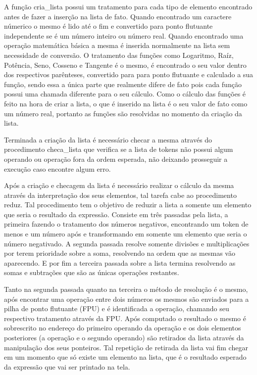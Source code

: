 \documentclass[12pt]{article}
\begin{document}
A função cria\_lista possui um tratamento para cada tipo de elemento encontrado antes de fazer a inserção na lista de fato. Quando encontrado um caractere númerico o mesmo é lido até o fim e convertido para ponto flutuante independente se é um número inteiro ou número real. Quando encontrado uma operação matemática básica a mesma é inserida normalmente na lista sem necessidade de conversão. O tratamento das funções como Logaritmo, Raíz, Potência, Seno, Cosseno e Tangente é o mesmo, é encontrado o seu valor dentro dos respectivos parênteses, convertido para para ponto flutuante e calculado a sua função, sendo essa a única parte que realmente difere de fato pois cada função possui uma chamada diferente para o seu cálculo. Como o cálculo das funções é feito na hora de criar a lista, o que é inserido na lista é o seu valor de fato como um número real, portanto as funções são resolvidas no momento da criação da lista.

Terminada a criação da lista é necessário checar a mesma através do procedimento checa\_lista que verifica se a lista de tokens não possui algum operando ou operação fora da ordem esperada, não deixando prosseguir a execução caso encontre algum erro.

Após a criação e checagem da lista é necessário realizar o cálculo da mesma através da interpretação dos seus elementos, tal tarefa cabe ao procedimento reduz. Tal procedimento tem o objetivo de reduzir a lista a somente um elemento que seria o resultado da expressão. Consiste em três passadas pela lista, a primeira fazendo o tratamento dos números negativos, encontrando um token de menos e um número após e transformando em somente um elemento que seria o número negativado. A segunda passada resolve somente divisões e multiplicações por terem prioridade sobre a soma, resolvendo na ordem que as mesmas vão aparecendo. E por fim a terceira passada sobre a lista termina resolvendo as somas e subtrações que são as únicas operações restantes.

Tanto na segunda passada quanto na terceira o método de resolução é o mesmo, após encontrar uma operação entre dois números os mesmos são enviados para a pilha de ponto flutuante (FPU) e é identificada a operação, chamando seu respectivo tratamento através da FPU. Após computado o resultado o mesmo é sobrescrito no endereço do primeiro operando da operação e os dois elementos posteriores (a operação e o segundo operando) são retirados da lista através da manipulação dos seus ponteiros. Tal repetição de retirada da lista vai fim chegar em um momento que só existe um elemento na lista, que é o resultado esperado da expressão que vai ser printado na tela.
\end{document}
